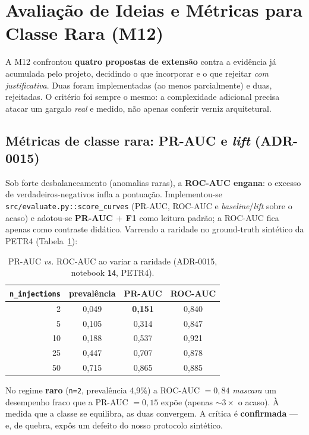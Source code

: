 \section{Avaliação de Ideias e Métricas para Classe Rara (M12)}
\label{sec:m12}

A M12 confrontou \textbf{quatro propostas de extensão} contra a evidência já acumulada pelo projeto,
decidindo o que incorporar e o que rejeitar \emph{com justificativa}. Duas foram implementadas
(ao menos parcialmente) e duas, rejeitadas. O critério foi sempre o mesmo: a complexidade adicional
precisa atacar um gargalo \emph{real} e medido, não apenas conferir verniz arquitetural.

\subsection{Métricas de classe rara: PR-AUC e \emph{lift} (ADR-0015)}
\label{sec:m12-prauc}
Sob forte desbalanceamento (anomalias raras), a \textbf{ROC-AUC engana}: o excesso de
verdadeiros-negativos infla a pontuação. Implementou-se \texttt{src/evaluate.py::score\_curves}
(PR-AUC, ROC-AUC e \emph{baseline}/\emph{lift} sobre o acaso) e adotou-se \textbf{PR-AUC $+$ F1}
como leitura padrão; a ROC-AUC fica apenas como contraste didático. Varrendo a raridade no ground-truth
sintético da PETR4 (Tabela~\ref{tab:m12-prauc}):

\begin{table}[h]
\centering
\caption{PR-AUC \emph{vs.} ROC-AUC ao variar a raridade (ADR-0015, notebook \texttt{14}, PETR4).}
\label{tab:m12-prauc}
\begin{tabular}{rccc}
\toprule
\texttt{n\_injections} & prevalência & \textbf{PR-AUC} & ROC-AUC \\
\midrule
2  & 0,049 & \textbf{0,151} & 0,840 \\
5  & 0,105 & 0,314 & 0,847 \\
10 & 0,188 & 0,537 & 0,921 \\
25 & 0,447 & 0,707 & 0,878 \\
50 & 0,715 & 0,865 & 0,885 \\
\bottomrule
\end{tabular}
\end{table}

\noindent No regime \textbf{raro} (\texttt{n=2}, prevalência 4,9\%) a ROC-AUC $= 0{,}84$ \emph{mascara}
um desempenho fraco que a PR-AUC $= 0{,}15$ expõe (apenas ${\sim}3\times$ o acaso). À medida que a classe
se equilibra, as duas convergem. A crítica é \textbf{confirmada} --- e, de quebra, expôs um defeito do
nosso protocolo sintético.

